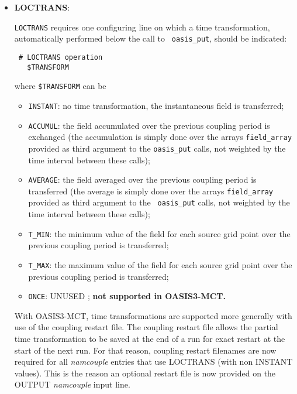 \begin{itemize}

\item {\bf LOCTRANS}:

  {\tt LOCTRANS} requires one configuring line on which a time
  transformation, automatically performed below the call to {\tt
    oasis\_put}, should be indicated:

  \begin{verbatim}
 # LOCTRANS operation
   $TRANSFORM
\end{verbatim}
  \vspace{-0.2cm} where {\tt \$TRANSFORM} can be
  \begin{itemize}
  \item {\tt INSTANT}: no time transformation, the instantaneous field
    is transferred;
  \item {\tt ACCUMUL}: the field accumulated over the previous
    coupling period is exchanged (the accumulation is simply done over
    the arrays {\tt field\_array} provided as third argument to the
    {\tt oasis\_put} calls, not weighted by the time interval between
    these calls);
  \item {\tt AVERAGE}: the field averaged over the previous coupling
    period is transferred (the average is simply done over the arrays
    {\tt field\_array} provided as third argument to the {\tt
      oasis\_put} calls, not weighted by the time interval between
    these calls);
  \item {\tt T\_MIN}: the minimum value of the field for each source
    grid point over the previous coupling period is transferred;
  \item {\tt T\_MAX}: the maximum value of the field for each source
    grid point over the previous coupling period is transferred;
  \item {\tt ONCE}: UNUSED ; {\bf not supported in OASIS3-MCT.}
  \end{itemize}

  With OASIS3-MCT, time transformations are supported more generally
  with use of the coupling restart file.  The coupling restart file
  allows the partial time transformation to be saved at the end of a
  run for exact restart at the start of the next run.  For that
  reason, coupling restart filenames are now required for all {\it
    namcouple} entries that use LOCTRANS (with non INSTANT
  values). This is the reason an optional restart file is now provided
  on the OUTPUT {\it namcouple} input line.

\end{itemize}


